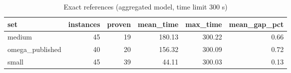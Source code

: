 \begin{table}[htbp]
\centering
\small
\caption{Exact references (aggregated model, time limit 300 s)}
\label{tab:references_summary}
\begin{tabular}{lrrrrr}
\toprule
set & instances & proven & mean\_time & max\_time & mean\_gap\_pct \\
\midrule
medium & 45 & 19 & 180.13 & 300.22 & 0.66 \\
omega\_published & 40 & 20 & 156.32 & 300.09 & 0.72 \\
small & 45 & 39 & 44.11 & 300.03 & 0.13 \\
\bottomrule
\end{tabular}
\end{table}
